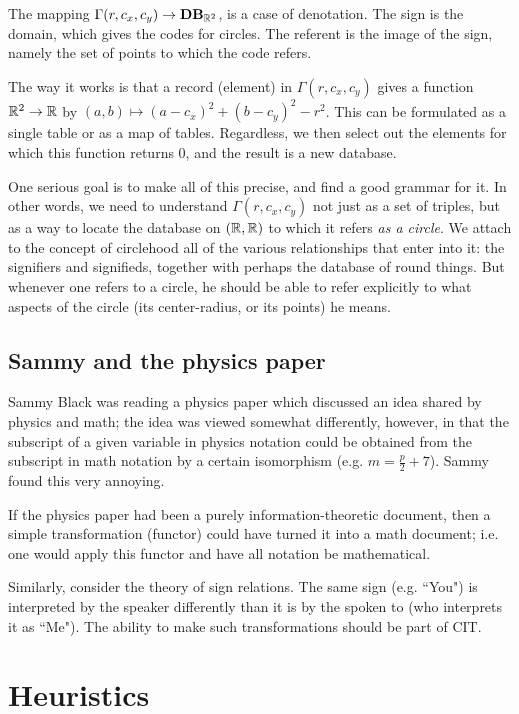 \documentclass{amsart}
\begin{document}
The mapping $\Gamma(r,c_x,c_y)\rightarrow{\bf DB}_{{\mathbb R}^2}$, is a case of denotation.  The sign is the domain, which gives the codes for circles.  The referent is the image of the sign, namely the set of points to which the code refers.  

The way it works is that a record (element) in $\Gamma(r,c_x,c_y)$ gives a function ${\mathbb R}^2\rightarrow{\mathbb R}$ by $(a,b)\mapsto(a-c_x)^2+(b-c_y)^2-r^2$.  This can be formulated as a single table or as a map of tables.  Regardless, we then select out the elements for which this function returns $0$, and the result is a new database.  

One serious goal is to make all of this precise, and find a good grammar for it.  In other words, we need to understand $\Gamma(r,c_x,c_y)$ not just as a set of triples, but as a way to locate the database on $({\mathbb R},{\mathbb R})$ to which it refers {\em as a circle}.  We attach to the concept of circlehood all of the various relationships that enter into it: the signifiers and signifieds, together with perhaps the database of round things.  But whenever one refers to a circle, he should be able to refer explicitly to what aspects of the circle (its center-radius, or its points) he means.

\subsection{Sammy and the physics paper}

Sammy Black was reading a physics paper which discussed an idea shared by physics and math; the idea was viewed somewhat differently, however, in that the subscript of a given variable in physics notation could be obtained from the subscript in math notation by a certain isomorphism (e.g. $m=\frac{p}{2}+7$).  Sammy found this very annoying. 

If the physics paper had been a purely information-theoretic document, then a simple transformation (functor) could have turned it into a math document; i.e. one would apply this functor and have all notation be mathematical.  

Similarly, consider the theory of sign relations.  The same sign (e.g. ``You") is interpreted by the speaker differently than it is by the spoken to (who interprets it as ``Me").  The ability to make such transformations should be part of CIT.

\section{Heuristics}
\end{document}
